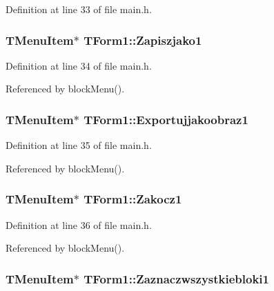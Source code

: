 Definition at line 33 of file main.h.\hypertarget{classTForm1_f4ce8bd1ea8a930a09853d724191f193}{
\subsubsection[Zapiszjako1]{\setlength{\rightskip}{0pt plus 5cm}TMenuItem$\ast$ {\bf TForm1::Zapiszjako1}}}
\label{classTForm1_f4ce8bd1ea8a930a09853d724191f193}




Definition at line 34 of file main.h.

Referenced by blockMenu().\hypertarget{classTForm1_c8bedfca7b5dfed39edaff95ffb0577d}{
\subsubsection[Exportujjakoobraz1]{\setlength{\rightskip}{0pt plus 5cm}TMenuItem$\ast$ {\bf TForm1::Exportujjakoobraz1}}}
\label{classTForm1_c8bedfca7b5dfed39edaff95ffb0577d}




Definition at line 35 of file main.h.

Referenced by blockMenu().\hypertarget{classTForm1_6a033c3575a2e29c17d7c286029980f1}{
\subsubsection[Zakocz1]{\setlength{\rightskip}{0pt plus 5cm}TMenuItem$\ast$ {\bf TForm1::Zakocz1}}}
\label{classTForm1_6a033c3575a2e29c17d7c286029980f1}




Definition at line 36 of file main.h.

Referenced by blockMenu().\hypertarget{classTForm1_c11d4781566f19fd9dae9e3375ab1471}{
\subsubsection[Zaznaczwszystkiebloki1]{\setlength{\rightskip}{0pt plus 5cm}TMenuItem$\ast$ {\bf TForm1::Zaznaczwszystkiebloki1}}}
\label{classTForm1_c11d4781566f19fd9dae9e3375ab1471}




